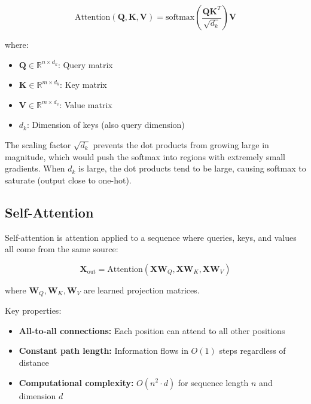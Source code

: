 \begin{equation}
\text{Attention}(\mathbf{Q}, \mathbf{K}, \mathbf{V}) = \text{softmax}\left(\frac{\mathbf{Q}\mathbf{K}^T}{\sqrt{d_k}}\right)\mathbf{V}
\label{eq:attention}
\end{equation}

where:
\begin{itemize}
    \item $\mathbf{Q} \in \mathbb{R}^{n \times d_k}$: Query matrix
    \item $\mathbf{K} \in \mathbb{R}^{m \times d_k}$: Key matrix
    \item $\mathbf{V} \in \mathbb{R}^{m \times d_v}$: Value matrix
    \item $d_k$: Dimension of keys (also query dimension)
\end{itemize}

\begin{note}
The scaling factor $\sqrt{d_k}$ prevents the dot products from growing large in magnitude, which would push the softmax into regions with extremely small gradients. When $d_k$ is large, the dot products tend to be large, causing softmax to saturate (output close to one-hot).
\end{note}

\subsection{Self-Attention}

Self-attention is attention applied to a sequence where queries, keys, and values all come from the same source:

\begin{equation}
\mathbf{X}_{\text{out}} = \text{Attention}(\mathbf{X}\mathbf{W}_Q, \mathbf{X}\mathbf{W}_K, \mathbf{X}\mathbf{W}_V)
\end{equation}

where $\mathbf{W}_Q, \mathbf{W}_K, \mathbf{W}_V$ are learned projection matrices.

Key properties:
\begin{itemize}
    \item \textbf{All-to-all connections:} Each position can attend to all other positions
    \item \textbf{Constant path length:} Information flows in $O(1)$ steps regardless of distance
    \item \textbf{Computational complexity:} $O(n^2 \cdot d)$ for sequence length $n$ and dimension $d$
\end{itemize}

